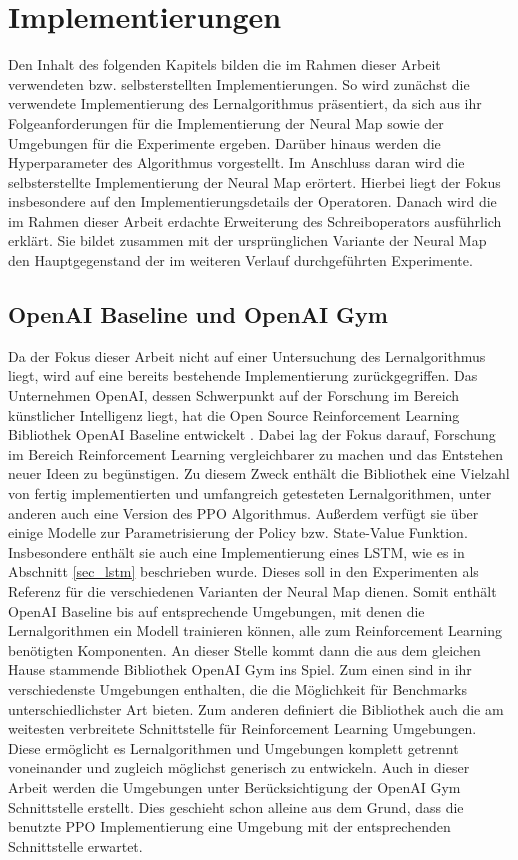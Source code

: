 \chapter{Implementierungen}

Den Inhalt des folgenden Kapitels bilden die im Rahmen dieser Arbeit verwendeten bzw. selbsterstellten Implementierungen. So wird zunächst die verwendete Implementierung des Lernalgorithmus präsentiert, da sich aus ihr Folgeanforderungen für die Implementierung der Neural Map sowie der Umgebungen für die Experimente ergeben. Darüber hinaus werden die Hyperparameter des Algorithmus vorgestellt. Im Anschluss daran wird die selbsterstellte Implementierung der Neural Map erörtert. Hierbei liegt der Fokus insbesondere auf den Implementierungsdetails der Operatoren. Danach wird die im Rahmen dieser Arbeit erdachte Erweiterung des Schreiboperators ausführlich erklärt. Sie bildet zusammen mit der ursprünglichen Variante der Neural Map den Hauptgegenstand der im weiteren Verlauf durchgeführten Experimente.


\section{OpenAI Baseline und OpenAI Gym}
Da der Fokus dieser Arbeit nicht auf einer Untersuchung des Lernalgorithmus liegt, wird auf eine bereits bestehende Implementierung zurückgegriffen. Das Unternehmen OpenAI, dessen Schwerpunkt auf der Forschung im Bereich künstlicher Intelligenz liegt, hat die Open Source Reinforcement Learning Bibliothek OpenAI Baseline entwickelt \cite{Baselines}. Dabei lag der Fokus darauf, Forschung im Bereich Reinforcement Learning vergleichbarer zu machen und das Entstehen neuer Ideen zu begünstigen. Zu diesem Zweck enthält die Bibliothek eine Vielzahl von fertig implementierten und umfangreich getesteten Lernalgorithmen, unter anderen auch eine Version des PPO Algorithmus. Außerdem verfügt sie über einige Modelle zur Parametrisierung der Policy bzw. State-Value Funktion. Insbesondere enthält sie auch eine Implementierung eines LSTM, wie es in Abschnitt \ref{sec_lstm} beschrieben wurde. Dieses soll in den Experimenten als Referenz für die verschiedenen Varianten der Neural Map dienen. Somit enthält OpenAI Baseline bis auf entsprechende Umgebungen, mit denen die Lernalgorithmen ein Modell trainieren können, alle zum Reinforcement Learning benötigten Komponenten. An dieser Stelle kommt dann die aus dem gleichen Hause stammende Bibliothek OpenAI Gym ins Spiel. Zum einen sind in ihr verschiedenste Umgebungen enthalten, die die Möglichkeit für Benchmarks unterschiedlichster Art bieten. Zum anderen definiert die Bibliothek auch die am weitesten verbreitete Schnittstelle für Reinforcement Learning Umgebungen. Diese ermöglicht es Lernalgorithmen und Umgebungen komplett getrennt voneinander und zugleich möglichst generisch zu entwickeln. Auch in dieser Arbeit werden die Umgebungen unter Berücksichtigung der OpenAI Gym Schnittstelle erstellt. Dies geschieht schon alleine aus dem Grund, dass die benutzte PPO Implementierung eine Umgebung mit der entsprechenden Schnittstelle erwartet.

